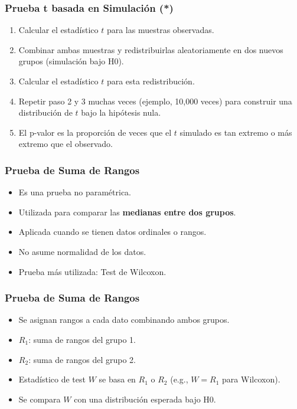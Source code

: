 \documentclass[aspectratio=169]{beamer}
\begin{document}
\begin{frame}
\frametitle{Prueba t basada en Simulación (*)}
\begin{enumerate}
\item Calcular el estadístico \( t \) para las muestras observadas.
\item Combinar ambas muestras y redistribuirlas aleatoriamente en dos nuevos grupos (simulación bajo H0).
\item Calcular el estadístico \( t \) para esta redistribución.
\item Repetir paso 2 y 3 muchas veces (ejemplo, 10,000 veces) para construir una distribución de \( t \) bajo la hipótesis nula.
\item El p-valor es la proporción de veces que el \( t \) simulado es tan extremo o más extremo que el observado.
\end{enumerate}
\end{frame}


\begin{frame}
\frametitle{Prueba de Suma de Rangos}
\begin{itemize}
\item Es una prueba no paramétrica.
\item Utilizada para comparar las {\bf medianas entre dos grupos}.
\item Aplicada cuando se tienen datos ordinales o rangos.
\item No asume normalidad de los datos.
\item Prueba más utilizada: Test de Wilcoxon.
\end{itemize}
\end{frame}

\begin{frame}
\frametitle{Prueba de Suma de Rangos}
\begin{itemize}
\item Se asignan rangos a cada dato combinando ambos grupos.
\item \( R_1 \): suma de rangos del grupo 1.
\item \( R_2 \): suma de rangos del grupo 2.
\item Estadístico de test \( W \) se basa en \( R_1 \) o \( R_2 \) (e.g., \( W = R_1 \) para Wilcoxon).
\item Se compara \( W \) con una distribución esperada bajo H0.
\end{itemize}
\end{frame}
\end{document}
